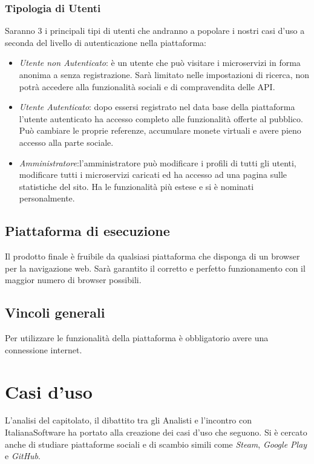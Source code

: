 \documentclass[12pt,a4paper,titlepage]{article}
\begin{document}
	\subsubsection{Tipologia di Utenti}
	Saranno 3 i principali tipi di utenti che andranno a popolare i nostri casi d'uso a seconda del livello di autenticazione nella piattaforma:
	\begin{itemize}
		\item \textit{Utente non Autenticato}: è un utente che può visitare i microservizi in forma anonima a senza registrazione. Sarà limitato nelle impostazioni di ricerca, non potrà accedere alla funzionalità sociali e di compravendita delle API.
		\item \textit{Utente Autenticato}: dopo essersi registrato nel data base della piattaforma l'utente autenticato ha accesso completo alle funzionalità offerte al pubblico. Può cambiare le proprie referenze, accumulare monete virtuali e avere pieno accesso alla parte sociale. 
		\item \textit{Amministratore}:l'amministratore può modificare i profili di tutti gli utenti, modificare tutti i microservizi caricati ed ha accesso ad una pagina sulle statistiche del sito. Ha le funzionalità più estese e si è nominati personalmente. 
	\end{itemize}
	
	
	
	\subsection{Piattaforma di esecuzione}
	Il prodotto finale è fruibile da qualsiasi piattaforma che disponga di un browser per la navigazione web. Sarà garantito il corretto e perfetto funzionamento con il maggior numero di browser possibili. 

	\subsection{Vincoli generali}
	Per utilizzare le funzionalità della piattaforma è obbligatorio avere una connessione internet.
	\newpage
	
	\section{Casi d'uso}
	L'analisi del capitolato, il dibattito tra gli Analisti e l'incontro con ItalianaSoftware ha portato alla creazione dei casi d'uso che seguono. Si è cercato anche di studiare piattaforme sociali e di scambio simili come \textit{Steam}, \textit{Google Play} e \textit{GitHub}.
	
\end{document}

